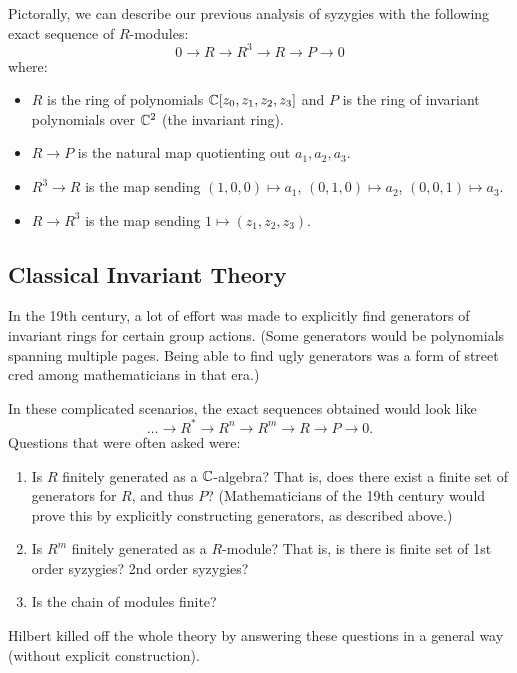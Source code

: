 Pictorally, we can describe our previous analysis of syzygies with the following exact sequence of $R$-modules:
\[
    0 \to R \to R^3 \to R \to P \to 0
\]
where:
\begin{itemize}
    \item $R$ is the ring of polynomials ${\mathbb C}[z_0, z_1, z_2, z_3]$ and $P$ is the ring of invariant polynomials over ${\mathbb C}^2$ (the invariant ring).
    \item $R \to P$ is the natural map quotienting out $a_1, a_2, a_3$.
    \item $R^3 \to R$ is the map sending $(1,0,0) \mapsto a_1$, $(0,1,0) \mapsto a_2$, $(0,0,1) \mapsto a_3$.
    \item $R \to R^3$ is the map sending $1 \mapsto (z_1, z_2, z_3)$.
\end{itemize}

\subsection{Classical Invariant Theory}
In the 19th century, a lot of effort was made to explicitly find generators of invariant rings for certain group actions. (Some generators would be polynomials spanning multiple pages. Being able to find ugly generators was a form of street cred among mathematicians in that era.)

In these complicated scenarios, the exact sequences obtained would look like
\[
    \dots \to R^* \to R^n \to R^m \to R \to P \to 0.
\]
Questions that were often asked were:
\begin{enumerate}
    \item Is $R$ finitely generated as a ${\mathbb C}$-algebra? That is, does there exist a finite set of generators for $R$, and thus $P$? (Mathematicians of the 19th century would prove this by explicitly constructing generators, as described above.)
    \item Is $R^m$ finitely generated as a $R$-module? That is, is there is finite set of 1st order syzygies? 2nd order syzygies?
    \item Is the chain of modules finite?
\end{enumerate}
Hilbert killed off the whole theory by answering these questions in a general way (without explicit construction).
